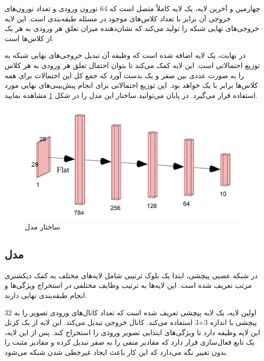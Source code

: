 چهارمین و آخرین لایه، یک لایه کاملاً متصل است که 64 نورون ورودی و تعداد نورون‌های خروجی آن برابر با تعداد کلاس‌های موجود در مسئله طبقه‌بندی است. این لایه خروجی‌های نهایی شبکه را تولید می‌کند که نشان‌دهنده میزان تعلق هر ورودی به هر یک از کلاس‌ها است.

در نهایت، یک لایه 
اضافه شده است که وظیفه آن تبدیل خروجی‌های نهایی شبکه به توزیع احتمالاتی است. این لایه کمک می‌کند تا بتوان احتمال تعلق هر ورودی به هر کلاس را به صورت عددی بین صفر و یک بدست آورد که جمع کل این احتمالات برای همه کلاس‌ها برابر با یک خواهد بود. این توزیع احتمالاتی برای انجام پیش‌بینی‌های نهایی مورد استفاده قرار می‌گیرد. در پایان می‌توانید ساختار این مدل را در شکل
\ref{mlp}
مشاهده نمایید.

\begin{figure}[b!]
	\centering
	\includegraphics[scale=0.7]{images/chap5/mlp.png}%
	\caption{
		ساختار مدل 
	}
	\label{mlp}
	\centering
\end{figure}



\subsection{
	مدل
}
در شبکه عصبی پیچشی، ابتدا یک بلوک ترتیبی شامل لایه‌های مختلف به کمک دیکشنری مرتب تعریف شده است. این لایه‌ها به ترتیب وظایف مختلفی در استخراج ویژگی‌ها و انجام طبقه‌بندی نهایی دارند.

اولین لایه، یک لایه پیچشی تعریف شده است که تعداد کانال‌های ورودی تصویر را به 32 کانال خروجی تبدیل می‌کند. این لایه از یک کرنل ‎پیچشی با اندازه
3$\times$3
استفاده می‌کند. این لایه وظیفه دارد تا ویژگی‌های ابتدایی تصویر ورودی را استخراج کند. پس از این لایه، یک تابع فعال‌سازی 
قرار دارد که مقادیر منفی را به صفر تبدیل کرده و مقادیر مثبت را بدون تغییر نگه می‌دارد که این کار باعث ایجاد غیرخطی‌ شدن شبکه می‌شود.

